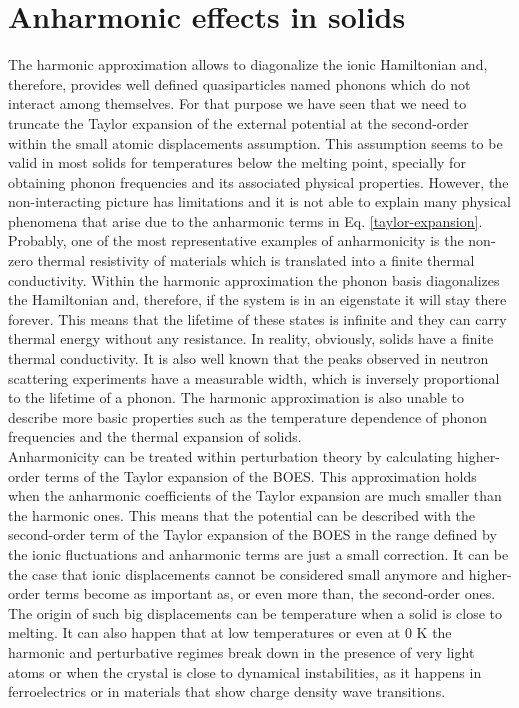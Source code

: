 \section{Anharmonic effects in solids}
The harmonic approximation allows to diagonalize the ionic Hamiltonian and, therefore, provides well defined 
quasiparticles named phonons which do not interact among themselves. For that purpose 
we have seen that we need to truncate the Taylor expansion of the external potential at the second-order within the small atomic displacements assumption. This assumption seems to be valid in most solids 
for temperatures below the melting point, specially for obtaining phonon frequencies and its associated physical properties\cite{born1954dynamical}. However, the non-interacting picture has limitations and it 
is not able to explain many physical phenomena that arise due to the anharmonic terms in Eq. \ref{taylor-expansion}. Probably, one of the most representative examples of anharmonicity is the non-zero thermal 
resistivity of materials which is translated into a finite thermal conductivity. Within the harmonic approximation the phonon basis diagonalizes the Hamiltonian and, therefore, if the system is in an eigenstate 
it will stay there forever. This means that the lifetime of these states is infinite and they can carry thermal energy without any resistance. In reality, obviously, solids have a finite thermal conductivity. 
It is also well known that the peaks observed in neutron scattering experiments have a measurable width, which is inversely proportional to the lifetime of a phonon. The harmonic approximation is also unable 
to describe more basic properties such as the temperature dependence of phonon frequencies and the thermal expansion of solids. \\ 

Anharmonicity can be treated within perturbation theory by calculating higher-order terms of the Taylor expansion of the BOES. This approximation holds when the anharmonic coefficients of the Taylor expansion 
are much smaller than the harmonic ones. This means that the potential can be described with the second-order term of the Taylor expansion of the BOES in the range defined by the ionic fluctuations and anharmonic 
terms are just a small correction. It can be the case that ionic displacements cannot be considered small anymore and higher-order terms become as important as, or even more than, the second-order 
ones. The origin of such big displacements can be temperature when a solid is close to melting. It can also happen that at low temperatures or even at $0$ K the harmonic and perturbative regimes break down in the 
presence of very light atoms\cite{borinaga2017anharmonicity} or when the crystal is close to dynamical instabilities, as it happens in 
ferroelectrics\cite{ribeiro2018strong,zhang2011anomalous} or in materials that show charge density wave transitions\cite{kidd2002electron,leroux2015strong}. \\

